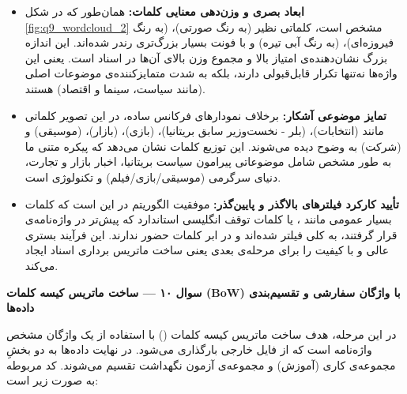 \documentclass{article}
\begin{document}
    \begin{itemize}
        \item \textbf{ابعاد بصری و وزن‌دهی معنایی کلمات:}
        همان‌طور که در شکل \ref{fig:q9_wordcloud_2} مشخص است، کلماتی نظیر  (به رنگ صورتی)،  (به رنگ فیروزه‌ای)،  (به رنگ آبی تیره) و  با فونت بسیار بزرگ‌تری رندر شده‌اند. این اندازه بزرگ نشان‌دهنده‌ی امتیاز بالا و مجموع وزن  بالای آن‌ها در اسناد است. یعنی این واژه‌ها نه‌تنها تکرار قابل‌قبولی دارند، بلکه به شدت متمایزکننده‌ی موضوعات اصلی (مانند سیاست، سینما و اقتصاد) هستند.
        
        \item \textbf{تمایز موضوعی آشکار:}
        برخلاف نمودارهای فرکانس ساده، در این تصویر کلماتی مانند  (انتخابات)،  (بلر - نخست‌وزیر سابق بریتانیا)،  (بازی)،  (بازار)،  (موسیقی) و  (شرکت) به وضوح دیده می‌شوند. این توزیع کلمات نشان می‌دهد که پیکره متنی ما به طور مشخص شامل موضوعاتی پیرامون سیاست بریتانیا، اخبار بازار و تجارت، دنیای سرگرمی (موسیقی/بازی/فیلم) و تکنولوژی است.
        
        \item \textbf{تأیید کارکرد فیلترهای بالاگذر و پایین‌گذر:}
        موفقیت الگوریتم در این است که کلمات بسیار عمومی مانند ،  یا کلمات توقف انگلیسی استاندارد که پیش‌تر در واژه‌نامه‌ی  قرار گرفتند، به کلی فیلتر شده‌اند و در ابر کلمات حضور ندارند. این فرآیند بستری عالی و با کیفیت را برای مرحله‌ی بعدی یعنی ساخت ماتریس برداری اسناد ایجاد می‌کند.
    \end{itemize}

\noindent\textbf{سوال ۱۰ --- ساخت ماتریس کیسه کلمات (BoW) با واژگان سفارشی و تقسیم‌بندی داده‌ها}
    
   \noindent در این مرحله، هدف ساخت ماتریس کیسه کلمات () با استفاده از یک واژگان مشخص واژه‌نامه است که از فایل خارجی  بارگذاری می‌شود. در نهایت داده‌ها به دو بخشِ مجموعه‌ی کاری (آموزش) و مجموعه‌ی آزمون نگهداشت تقسیم می‌شوند. کد مربوطه به صورت زیر است:
\end{document}
